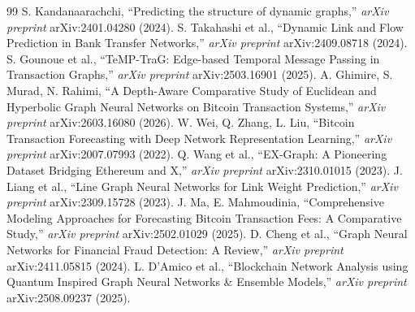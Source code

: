 \begin{thebibliography}{99}
 S. Kandanaarachchi, ``Predicting the structure of dynamic graphs,'' \textit{arXiv preprint} arXiv:2401.04280 (2024). 
 S. Takahashi et al., ``Dynamic Link and Flow Prediction in Bank Transfer Networks,'' \textit{arXiv preprint} arXiv:2409.08718 (2024). 
 S. Gounoue et al., ``TeMP-TraG: Edge-based Temporal Message Passing in Transaction Graphs,'' \textit{arXiv preprint} arXiv:2503.16901 (2025). 
 A. Ghimire, S. Murad, N. Rahimi, ``A Depth-Aware Comparative Study of Euclidean and Hyperbolic Graph Neural Networks on Bitcoin Transaction Systems,'' \textit{arXiv preprint} arXiv:2603.16080 (2026). 
 W. Wei, Q. Zhang, L. Liu, ``Bitcoin Transaction Forecasting with Deep Network Representation Learning,'' \textit{arXiv preprint} arXiv:2007.07993 (2022). 
 Q. Wang et al., ``EX-Graph: A Pioneering Dataset Bridging Ethereum and X,'' \textit{arXiv preprint} arXiv:2310.01015 (2023). 
 J. Liang et al., ``Line Graph Neural Networks for Link Weight Prediction,'' \textit{arXiv preprint} arXiv:2309.15728 (2023). 
 J. Ma, E. Mahmoudinia, ``Comprehensive Modeling Approaches for Forecasting Bitcoin Transaction Fees: A Comparative Study,'' \textit{arXiv preprint} arXiv:2502.01029 (2025). 
 D. Cheng et al., ``Graph Neural Networks for Financial Fraud Detection: A Review,'' \textit{arXiv preprint} arXiv:2411.05815 (2024). 
 L. D'Amico et al., ``Blockchain Network Analysis using Quantum Inspired Graph Neural Networks \& Ensemble Models,'' \textit{arXiv preprint} arXiv:2508.09237 (2025). 
\end{thebibliography}
